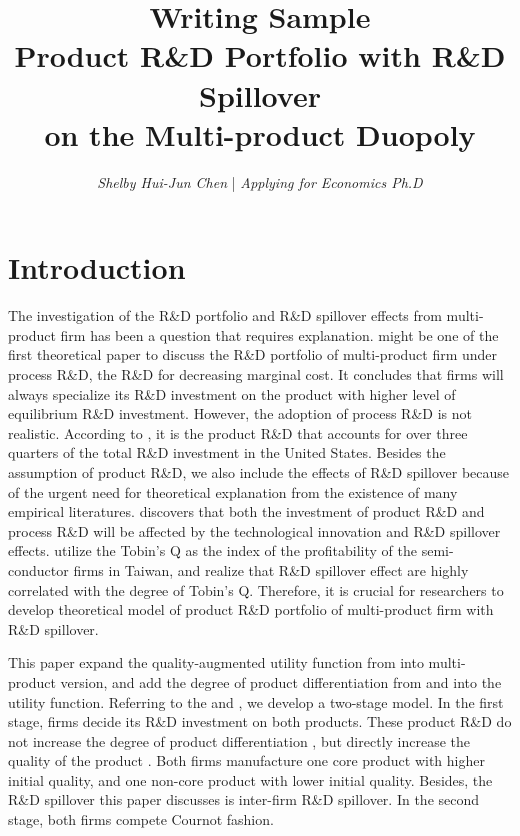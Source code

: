 \documentclass[12pt]{article}
\title{
        \vspace{-3ex}
        \textbf{\huge{Writing Sample}}\\
        \vspace{1ex}
        \Large{Product R\&D Portfolio with R\&D Spillover\\ on the Multi-product Duopoly}
        \vspace{-3ex}
    } %
\author{\textit{Shelby Hui-Jun Chen} | \textit{Applying for Economics Ph.D}}
\date{\vspace{-6ex}}
\begin{document}
\maketitle
\hrulefill
\section{Introduction} \label{sec:intro}

The investigation of the R\&D portfolio and R\&D spillover effects from multi-product firm has been a question that requires explanation. 
\textcite{lin_effects_2013} might be one of the first theoretical paper to discuss the R\&D portfolio of multi-product firm under process R\&D, the R\&D for decreasing marginal cost.
It concludes that firms will always specialize its R\&D investment on the product with higher level of equilibrium R\&D investment.
However, the adoption of process R\&D is not realistic.
According to \textcite{scherer1990economic}, it is the product R\&D that accounts for over three quarters of the total R\&D investment in the United States.
Besides the assumption of product R\&D, we also include the effects of R\&D spillover because of the urgent need for theoretical explanation from the existence of many empirical literatures.
\textcite{levin_cost-reducing_1989} discovers that both the investment of product R\&D and process R\&D will be affected by the technological innovation and R\&D spillover effects.
\textcite{chin_patent_2006-1} utilize the Tobin's Q as the index of the profitability of the semi-conductor firms in Taiwan, and realize that R\&D spillover effect are highly correlated with the degree of Tobin's Q.
Therefore, it is crucial for researchers to develop theoretical model of product R\&D portfolio of multi-product firm with R\&D spillover.

This paper expand the quality-augmented utility function from \textcite{symeonidis_comparing_2003} into multi-product version, and add the degree of product differentiation from \textcite{singh1984price} and \textcite{vives_efficiency_1985} into the utility function.
Referring to the \textcite{lin_product_2002-1} and \textcite{lin_effects_2013}, we develop a two-stage model. 
In the first stage, firms decide its R\&D investment on both products.
These product R\&D do not increase the degree of product differentiation \parencite{lin_product_2002-1}, but directly increase the quality of the product \parencite{symeonidis_cartel_1999}.
Both firms manufacture one core product with higher initial quality, and one non-core product with lower initial quality.
Besides, the R\&D spillover this paper discusses is inter-firm R\&D spillover.
In the second stage, both firms compete Cournot fashion.
\end{document}
